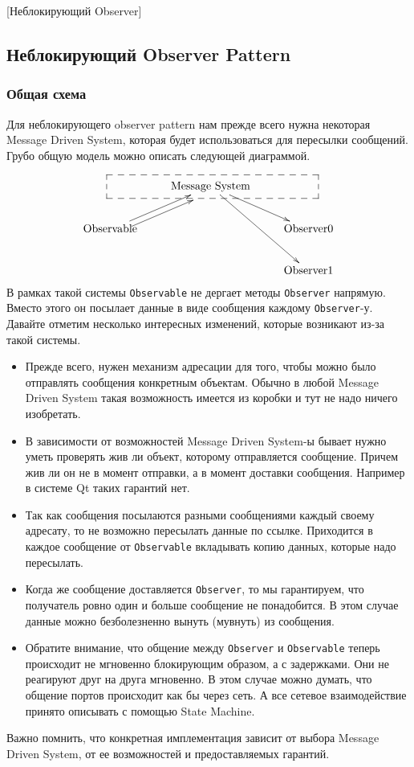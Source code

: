 [Неблокирующий Observer]


\subsection{Неблокирующий Observer Pattern}
\label{section::ObserverNonBlocking}

\subsubsection{Общая схема}

Для неблокирующего observer pattern нам прежде всего нужна некоторая Message Driven System, которая будет использоваться для пересылки сообщений.
Грубо общую модель можно описать следующей диаграммой.

\[
\xymatrix{
  {\vphantom{\text{Message System}}}
    {\save
  [].[rr]*+[F--]\frm{}
  \restore
  }  
  &{\text{Message System}}\ar[rd]\ar[rdd]&{}\\
  {\text{Observable}}\ar[ru]<-0.5em>\ar[ru]&{}&{\text{Observer0}}\\
  {}&{}&{\text{Observer1}}\\
}
\]
В рамках такой системы \verb"Observable" не дергает методы \verb"Observer" напрямую.
Вместо этого он посылает данные в виде сообщения каждому \verb"Observer"-у.
Давайте отметим несколько интересных изменений, которые возникают из-за такой системы.
\begin{itemize}
\item Прежде всего, нужен механизм адресации для того, чтобы можно было отправлять сообщения конкретным объектам.
Обычно в любой Message Driven System такая возможность имеется из коробки и тут не надо ничего изобретать.

\item В зависимости от возможностей Message Driven System-ы бывает нужно уметь проверять жив ли объект, которому отправляется сообщение.
Причем жив ли он не в момент отправки, а в момент доставки сообщения.
Например в системе Qt таких гарантий нет.

\item Так как сообщения посылаются разными сообщениями каждый своему адресату, то не возможно пересылать данные по ссылке.
Приходится в каждое сообщение от \verb"Observable" вкладывать копию данных, которые надо пересылать.

\item Когда же сообщение доставляется \verb"Observer", то мы гарантируем, что получатель ровно один и больше сообщение не понадобится.
В этом случае данные можно безболезненно вынуть (мувнуть) из сообщения.

\item Обратите внимание, что общение между \verb"Observer" и \verb"Observable" теперь происходит не мгновенно блокирующим образом, а с задержками.
Они не реагируют друг на друга мгновенно.
В этом случае можно думать, что общение портов происходит как бы через сеть.
А все сетевое взаимодействие принято описывать с помощью State Machine.
\end{itemize}
Важно помнить, что конкретная имплементация зависит от выбора Message Driven System, от ее возможностей и предоставляемых гарантий.

